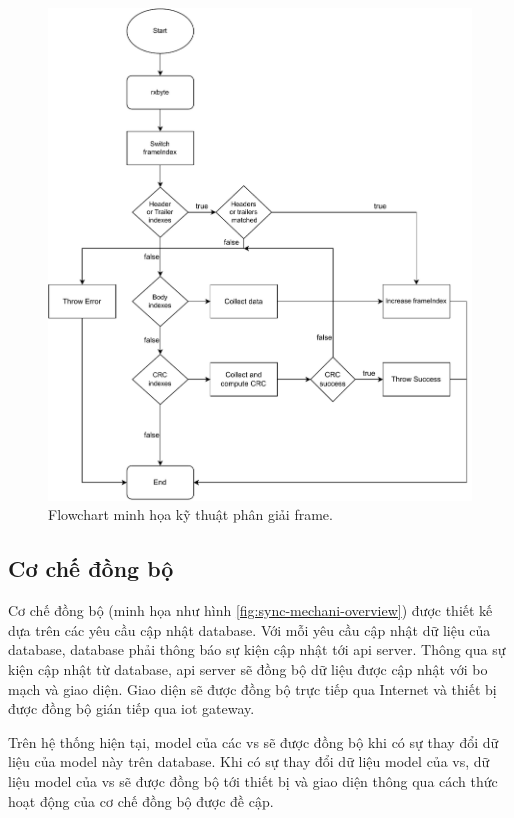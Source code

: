 \begin{figure}[htp]
\centering
\includegraphics[width=1.0\linewidth]{images/Thesis-Page-5-Frame-Parsing-Tech.pdf}
\caption{Flowchart minh họa kỹ thuật phân giải frame.}
\label{fig:frame-parsing-tech}
\end{figure}

\subsection{Cơ chế đồng bộ}
\label{VSync-Mecha}

Cơ chế đồng bộ (minh họa như hình \ref{fig:sync-mechani-overview}) được thiết kế dựa trên các yêu cầu cập nhật database. Với mỗi yêu cầu cập nhật dữ liệu của database, database phải thông báo sự kiện cập nhật tới \acrshort{api} server. Thông qua sự kiện cập nhật từ database, \acrshort{api} server sẽ đồng bộ dữ liệu được cập nhật với bo mạch và giao diện. Giao diện sẽ được đồng bộ trực tiếp qua Internet và thiết bị được đồng bộ gián tiếp qua \acrshort{iot} gateway.

Trên hệ thống hiện tại, model của các \acrfull{vs} sẽ được đồng bộ khi có sự thay đổi dữ liệu của model này trên database. Khi có sự thay đổi dữ liệu model của \acrshort{vs}, dữ liệu model của \acrshort{vs} sẽ được đồng bộ tới thiết bị và giao diện thông qua cách thức hoạt động của cơ chế đồng bộ được đề cập.

